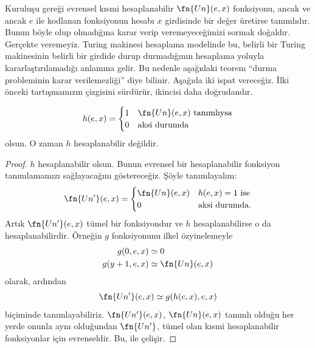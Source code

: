 


Kuruluşu gereği evrensel kısmi hesaplanabilir $\fn{Un}(e,x)$ fonksiyonu,
ancak ve ancak $e$ ile kodlanan fonksiyonun hesabı $x$ girdisinde bir değer
üretirse tanımlıdır. Bunun böyle olup olmadığına karar verip veremeyeceğimizi
sormak doğaldır. Gerçekte veremeyiz. Turing makinesi hesaplama modelinde bu,
belirli bir Turing makinesinin belirli bir girdide durup durmadığının
hesaplama yoluyla kararlaştırılamadığı anlamına gelir. Bu nedenle aşağıdaki
teorem ``durma probleminin karar verilemezliği'' diye bilinir. Aşağıda iki
ispat vereceğiz. İlki önceki tartışmamızın çizgisini sürdürür, ikincisi daha
doğrudandır.

\begin{thm}
\[
  h(e,x)=\begin{cases}
    1 & \text{$\fn{Un}(e,x)$ tanımlıysa}\\
    0 & \text{aksi durumda}
  \end{cases}
\]
olsun. O zaman $h$ hesaplanabilir değildir.
\end{thm}

\begin{proof}
$h$ hesaplanabilir olsun. Bunun evrensel bir hesaplanabilir fonksiyon
tanımlamamızı sağlayacağını göstereceğiz. Şöyle tanımlayalım:
\[
  \fn{Un'}(e,x)=\begin{cases}
    \fn{Un}(e,x) & \text{$h(e,x)=1$ ise}\\
    0 & \text{aksi durumda.}
  \end{cases}
\]
Artık $\fn{Un'}(e,x)$ tümel bir fonksiyondur ve $h$ hesaplanabilirse o da
hesaplanabilirdir. Örneğin $g$ fonksiyonunu ilkel özyinelemeyle
\begin{align*}
  g(0,e,x) & \simeq 0\\
  g(y+1,e,x) & \simeq \fn{Un}(e,x)
\end{align*}
olarak, ardından
\[
  \fn{Un'}(e,x)\simeq g(h(e,x),e,x)
\]
biçiminde tanımlayabiliriz. $\fn{Un'}(e,x)$, $\fn{Un}(e,x)$ tanımlı olduğu
her yerde onunla aynı olduğundan $\fn{Un'}$, tümel olan kısmi hesaplanabilir
fonksiyonlar için evrenseldir. Bu,  ile çelişir.
\end{proof}

